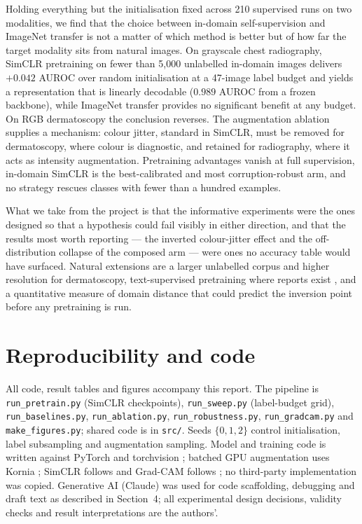 \documentclass{article}
\begin{document}
Holding everything but the initialisation fixed across 210 supervised runs on two
modalities, we find that the choice between in-domain self-supervision and ImageNet
transfer is not a matter of which method is better but of how far the target modality sits
from natural images. On grayscale chest radiography, SimCLR pretraining on fewer than
5{,}000 unlabelled in-domain images delivers $+0.042$ AUROC over random initialisation at
a 47-image label budget and yields a representation that is linearly decodable
($0.989$ AUROC from a frozen backbone), while ImageNet transfer provides no significant
benefit at any budget. On RGB dermatoscopy the conclusion reverses. The augmentation
ablation supplies a mechanism: colour jitter, standard in SimCLR, must be removed for
dermatoscopy, where colour is diagnostic, and retained for radiography, where it acts as
intensity augmentation. Pretraining advantages vanish at full supervision, in-domain
SimCLR is the best-calibrated and most corruption-robust arm, and no strategy rescues
classes with fewer than a hundred examples.

What we take from the project is that the informative experiments were the ones designed
so that a hypothesis could fail visibly in either direction, and that the results most
worth reporting --- the inverted colour-jitter effect and the off-distribution collapse of
the composed arm --- were ones no accuracy table would have surfaced. Natural extensions
are a larger unlabelled corpus and higher resolution for dermatoscopy, text-supervised
pretraining where reports exist \citep{zhang2022convirt,huang2021gloria}, and a
quantitative measure of domain distance that could predict the inversion point before any
pretraining is run.

\section*{Reproducibility and code}

All code, result tables and figures accompany this report. The pipeline is
\texttt{run\_pretrain.py} (SimCLR checkpoints), \texttt{run\_sweep.py} (label-budget
grid), \texttt{run\_baselines.py}, \texttt{run\_ablation.py}, \texttt{run\_robustness.py},
\texttt{run\_gradcam.py} and \texttt{make\_figures.py}; shared code is in \texttt{src/}.
Seeds $\{0,1,2\}$ control initialisation, label subsampling and augmentation sampling.
Model and training code is written against PyTorch and torchvision
\citep{he2016resnet}; batched GPU augmentation uses Kornia \citep{riquelme2025kornia};
SimCLR follows \citet{chen2020simclr} and Grad-CAM follows \citet{selvaraju2017gradcam};
no third-party implementation was copied. Generative AI (Claude) was used for code
scaffolding, debugging and draft text as described in Section~4; all experimental design
decisions, validity checks and result interpretations are the authors'.


\end{document}
